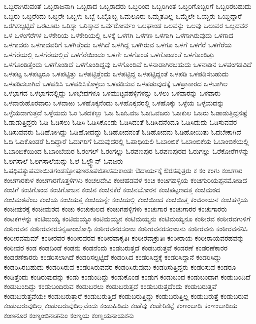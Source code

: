 {ಒಬ್ಬರಾಗಿರುವಂತೆ
ಒಬ್ಬರಾಜನಾಗಿ
ಒಬ್ಬರಾದ
ಒಬ್ಬರಾದರು
ಒಬ್ಬರಿಂದ
ಒಬ್ಬರಿಗಿಂತ
ಒಬ್ಬರಿಗೊಬ್ಬರಿಗೆ
ಒಬ್ಬರಿರಬಹುದು
ಒಬ್ಬರು
ಒಬ್ಬರೆಂದು
ಒಬ್ಬರೇ
ಒಬ್ಬಳು
ಒಬ್ಬೆ
ಒಬ್ಬೊಬ್ಬ
ಒಮಲೂರು
ಒಮ್ಮತವಿಲ್ಲ
ಒಮ್ಮೆಲೇ
ಒಯ್ದರು
ಒಯ್ದಿದ್ದಾರೆ
ಒರಗಿಸಲ್ಪಟ್ಟಿದೆ
ಒರಟೂರು
ಒರಿಸ್ಸಾ
ಒರಿಸ್ಸಾದ
ಒರ್ವರೋರ್ವಂ
ಒಲಘಾಂಡ
ಒಲವನ್ನು
ಒಲವು
ಒಲುವರ
ಒಲ್ಲದವರ
ಒಳ
ಒಳಂಗೆರೆಗಳ
ಒಳಕೇರಿಯ
ಒಳಕೇರಿಯಲ್ಲಿ
ಒಳಕ್ಕೆ
ಒಳಗಗಿ
ಒಳಗಣ
ಒಳಗಾಗಿ
ಒಳಗಾಗಿರುವುದು
ಒಳಗಾದ
ಒಳಗಾದರು
ಒಳಗಾದವರಿಗೆ
ಒಳಗಿತ್ತೆಂದು
ಒಳಗಿದೆ
ಒಳಗಿದ್ದ
ಒಳಗಿರುವ
ಒಳಗೂ
ಒಳಗೆ
ಒಳಗೆರೆ
ಒಳಗೆರೆಯ
ಒಳಗೆರೆಯಲ್ಲಿ
ಒಳಗೆರೆಯಲ್ಲಿದೆ
ಒಳಗೆರೆಯಿಂದಂ
ಒಳಗೇ
ಒಳಗೊಂಡ
ಒಳಗೊಂಡಂತೆ
ಒಳಗೊಂಡಿತ್ತು
ಒಳಗೊಂಡಿತ್ತೆಂದು
ಒಳಗೊಂಡಿದೆ
ಒಳಗೊಂಡಿದ್ದವು
ಒಳಗೊಂಡಿವೆ
ಒಳನಾಡಾಗಿರಬಹುದು
ಒಳನಾಡಿನ
ಒಳಪಂಗಡವಿದೆ
ಒಳಪಟ್ಟ
ಒಳಪಟ್ಟರೂ
ಒಳಪಟ್ಟಿತ್ತು
ಒಳಪಟ್ಟಿತ್ತೆಂದು
ಒಳಪಟ್ಟಿದ್ದ
ಒಳಪಟ್ಟಿದ್ದಂತೆ
ಒಳಪಡಿ
ಒಳಪಡಿಸಬಹುದು
ಒಳಪಡಿಸಲಾಗಿದೆ
ಒಳಪಡಿಸಿ
ಒಳಪಡಿಸಿಕೊಳ್ಳಲು
ಒಳಪಡಿಸುವ
ಒಳಪಡುವುದಕ್ಕೆ
ಒಳಪ್ರಾಕಾರದ
ಒಳಬಾಗಿಲ
ಒಳಭಾಗದ
ಒಳಭಾಗದಲ್ಲಿದ್ದು
ಒಳಭೇದಗಳೂ
ಒಳಮುಟ್ಟನಹಳ್ಳಿಗಳನ್ನು
ಒಳಲು
ಒಳವಾರನ್ನು
ಒಳವಾರು
ಒಳವಾರುಹೊರವಾರು
ಒಳವಾಱು
ಒಳಹೊಕ್ಕನೆಂದು
ಒಳಹೊಕ್ಕವರಲ್ಲಿ
ಒಳಹೊಕ್ಕು
ಒಳ್ಳೆಯ
ಒಳ್ಳೆಯದನ್ನು
ಒಳ್ಳೆಯದಾಗುತ್ತದೆ
ಒಳ್ಳೆಯದು
ಓಂ
ಓಕದಕಲ್ಲು
ಓಜ
ಓಜಓವಜ
ಓಜಓವಜರು
ಓಜಕುಲ
ಓಜರು
ಓಡಾಡುತ್ತಿದ್ದನಷ್ಟೆ
ಓಡಾಡುತ್ತಿದ್ದರು
ಓಡಿ
ಓಡಿಸಲು
ಓಡಿಸಿ
ಓಡಿಸಿಕೊಂಡು
ಓಡಿಸಿದಂತೆ
ಓಡಿಸಿದನೆಂದೂ
ಓಡಿಸಿದುದು
ಓಡಿಸುವವರ
ಓಡಿಸುವವರು
ಓಡಿಹೋಗಿದ್ದು
ಓಡಿಹೋದದ್ದು
ಓಡಿಹೋದನಂತೆ
ಓಡಿಹೋದನು
ಓಡಿಹೋಯಿತು
ಓದಬೇಕಾಗಿದೆ
ಓದಿ
ಓದಿಕೊಂಡರೆ
ಓದಿದ್ದಾರೆ
ಓದುಗರಿಗೆ
ಓದುವುದರಲ್ಲಿ
ಓಪಾಧಿಯಲಿ
ಓಬಾಂಬಿಕೆ
ಓಬಾಂಬಿಕೆಯ
ಓಬಾಂಬಿಕೆಯಲ್ಲಿ
ಓಬಾಂಬಿಕೆಯಿಂದ
ಓಬಾಂಬೆಯರ
ಓರಂಗಲ್
ಓರಂಗಲ್ಲು
ಓರಪಣಪುರ
ಓರಪಣಪುರದ
ಓರುಗಲ್ಲು
ಓರೆಕೋರೆಗಳನ್ನು
ಓಲಗಸಾಲೆ
ಓಲಗಸಾಲೆಯನ್ನು
ಓಲೆ
ಓಲ್ಡ್ಟೌನ್
ಓವಜರು
ಓಷಧಿಪತ್ಯುಪಮಾಯಿತಗಂಡಸ್ತೋಷಣರೂಪಜಿತಾಸಮಕಾಂಡಃ
ಔದಾರ್ಯಕ್ಕೆ
ಔರಸಪುತ್ರರು
ಕ
ಕಂ
ಕಂಗು
ಕಂಚಗಾರ
ಕಂಚಗಾರಕುಳ
ಕಂಚಗಾರಗೊತ್ತಳಿಗಳು
ಕಂಚಲದೇವಿ
ಕಂಚಹಡವಳ
ಕಂಚಿ
ಕಂಚಿಗಹಳ್ಳಿಯ
ಕಂಚಿಗುರಿಯಪ್ಪನಮೋಡಿದ
ಕಂಚಿಗೆ
ಕಂಚಿಗೊಂಡ
ಕಂಚಿಗೋಜನ
ಕಂಚಿನ
ಕಂಚಿನಕೆರೆ
ಕಂಚಿನಬೋರನ
ಕಂಚಿಪಟ್ಟಣದತ್ತ
ಕಂಚಿಮಠದ
ಕಂಚಿಮಠವೆಂಬ
ಕಂಚಿಯ
ಕಂಚಿಯತ್ತ
ಕಂಚಿಯನ್ನೇ
ಕಂಚಿಯಲ್ಲಿ
ಕಂಚಿಯಿಂದ
ಕಂಚಿಯಿತ್ತ
ಕಂಚಿರಾಯನ
ಕಂಚಿಹಳ್ಳಿಯ
ಕಂಚೀಪುರಕ್ಕೆ
ಕಂಚೀಮಠದ
ಕಂಚು
ಕಂಚುಕುಲದ
ಕಂಚುಗಹಳ್ಳಿಗಳು
ಕಂಚುಗಾರ
ಕಂಚುಗಾರರ
ಕಂಚುಗಾರರು
ಕಂಟಕಗಳನ್ನು
ಕಂಟಿಮಯ್ಯ
ಕಂಟಿಮಯ್ಯಂ
ಕಂಟಿಮಯ್ಯನ
ಕಂಟಿಮಯ್ಯನು
ಕಂಟಿಮಯ್ಯನೂ
ಕಂಠೀರವ
ಕಂಠೀರವಗುಳಿಗೆ
ಕಂಠೀರವನ
ಕಂಠೀರವನರಸನೃಪಾಂಬೋಧಿ
ಕಂಠೀರವನರಸರಾಜ
ಕಂಠೀರವನರಸರಾಜನು
ಕಂಠೀರವನು
ಕಂಠೀರವನೆನಿಸಿ
ಕಂಠೀರವಮಮ್
ಕಂಠೀರವರ
ಕಂಠೀರವರವ
ಕಂಠೀರವಾಕೃತಿಃ
ಕಂಠೀರವಾಕ್ರುತಿಃ
ಕಂಠೀರಾಯ
ಕಂಠೀರಾಯವರಹವನ್ನು
ಕಂಠೀವರ
ಕಂಡ
ಕಂಡದಿಂಡೆ
ಕಂಡನು
ಕಂಡನೆಂದು
ಕಂಡಬರುತ್ತದೆ
ಕಂಡಬರುತ್ತವೆ
ಕಂಡರಣೆ
ಕಂಡರಣೆಕಾರರ
ಕಂಡರಣೆಕಾರರು
ಕಂಡರಿಸಲಾಗಿದೆ
ಕಂಡರಿಸಲ್ಪಟ್ಟಿದೆ
ಕಂಡರಿಸಿದ
ಕಂಡರಿಸಿದ್ದಕ್ಕೆ
ಕಂಡರಿಸಿದ್ದಾನೆ
ಕಂಡರಿಸಿದ್ದು
ಕಂಡರಿಸಿರಬಹುದು
ಕಂಡರಿಸಿರುವ
ಕಂಡರಿಸಿರುವವರ
ಕಂಡರಿಸಿರುವುದು
ಕಂಡರಿಸುತ್ತಿದ್ದರು
ಕಂಡರಿಸುವ
ಕಂಡರೂ
ಕಂಡಿತ್ತೆಂದು
ಕಂಡಿರುವುದನ್ನು
ಕಂಡು
ಕಂಡುಂದಿದ್ದು
ಕಂಡುಕೊಂಡ
ಕಂಡುಗ
ಕಂಡುಬಂದ
ಕಂಡುಬಂದಾಗ
ಕಂಡುಬಂದಿದೆ
ಕಂಡುಬಂದಿದ್ದು
ಕಂಡುಬಂದಿರುವ
ಕಂಡುಬರಲು
ಕಂಡುಬರುತ್ತದೆ
ಕಂಡುಬರುತ್ತದೆಂದು
ಕಂಡುಬರುತ್ತವೆ
ಕಂಡುಬರುತ್ತವೆಯೇ
ಕಂಡುಬರುತ್ತಾರೆ
ಕಂಡುಬರುತ್ತಿದೆ
ಕಂಡುಬರುತ್ತಿದ್ದು
ಕಂಡುಬರುತ್ತಿಲ್ಲ
ಕಂಡುಬರುತ್ತೆ
ಕಂಡುಬರುವ
ಕಂಡುಬರುವುದಿಲ್ಲ
ಕಂಡುಬರುವುದಿಲ್ಲವೆಂದು
ಕಂಡುಹಿಡಿದು
ಕಂಡೆವು
ಕಂಡೇರಿಕಟ್ಟೆ
ಕಂಣಂಬಾಡಿ
ಕಂಣಂಬಾಡಿಯ
ಕಂಣನೂರ
ಕಂಣ್ನಂಬಿನಾತನುಂ
ಕಂಣ್ನಯ
ಕಂಣ್ನಯನಾಯಕನು
}
